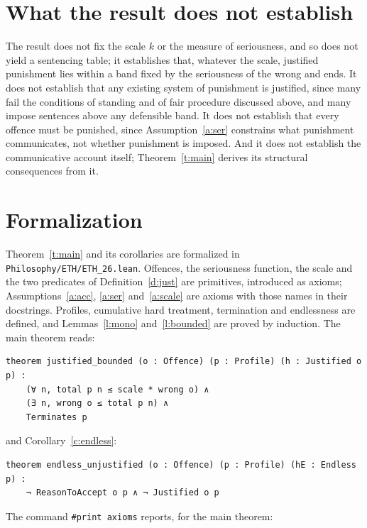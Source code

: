 \documentclass{situationist-preprint}
\begin{document}
\section{What the result does not establish}

The result does not fix the scale $k$ or the measure of seriousness, and so does not yield a sentencing table; it establishes that, whatever the scale, justified punishment lies within a band fixed by the seriousness of the wrong and ends. It does not establish that any existing system of punishment is justified, since many fail the conditions of standing and of fair procedure discussed above, and many impose sentences above any defensible band. It does not establish that every offence must be punished, since Assumption~\ref{a:ser} constrains what punishment communicates, not whether punishment is imposed. And it does not establish the communicative account itself; Theorem~\ref{t:main} derives its structural consequences from it.

\section{Formalization}

Theorem~\ref{t:main} and its corollaries are formalized in \nolinkurl{Philosophy/ETH/ETH_26.lean}. Offences, the seriousness function, the scale and the two predicates of Definition~\ref{d:just} are primitives, introduced as axioms; Assumptions~\ref{a:acc}, \ref{a:ser} and~\ref{a:scale} are axioms with those names in their docstrings. Profiles, cumulative hard treatment, termination and endlessness are defined, and Lemmas~\ref{l:mono} and~\ref{l:bounded} are proved by induction. The main theorem reads:

\begin{lstlisting}
theorem justified_bounded (o : Offence) (p : Profile) (h : Justified o p) :
    (∀ n, total p n ≤ scale * wrong o) ∧
    (∃ n, wrong o ≤ total p n) ∧
    Terminates p
\end{lstlisting}

\noindent and Corollary~\ref{c:endless}:

\begin{lstlisting}
theorem endless_unjustified (o : Offence) (p : Profile) (hE : Endless p) :
    ¬ ReasonToAccept o p ∧ ¬ Justified o p
\end{lstlisting}

\noindent The command \texttt{\#print axioms} reports, for the main theorem:
\end{document}
